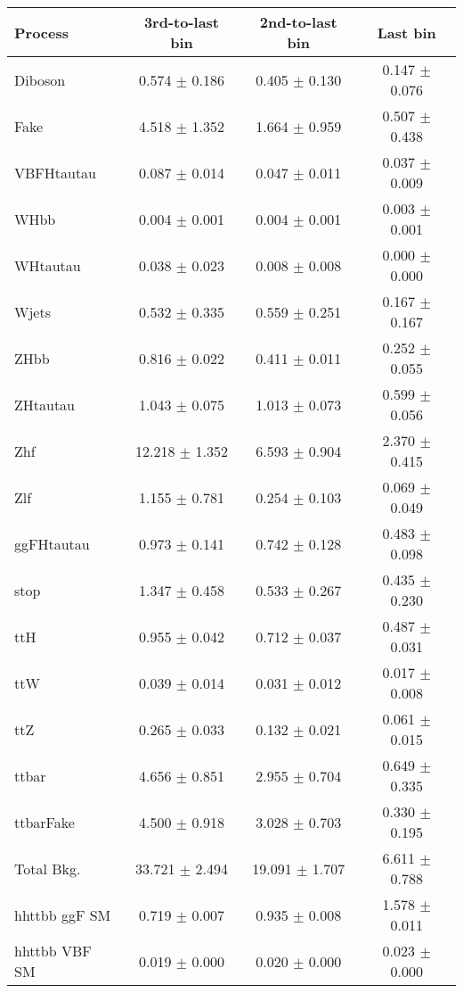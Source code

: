 \begin{tabular}{lccc}
  \toprule
  Process & 3rd-to-last bin & 2nd-to-last bin & Last bin \\
  \midrule
  Diboson &	0.574	$\pm$ 0.186	& 0.405	$\pm$ 0.130	& 0.147	$\pm$ 0.076 \\
  Fake &	4.518	$\pm$ 1.352	& 1.664	$\pm$ 0.959	& 0.507	$\pm$ 0.438 \\
  VBFHtautau &	0.087	$\pm$ 0.014	& 0.047	$\pm$ 0.011	& 0.037	$\pm$ 0.009 \\
  WHbb &	0.004	$\pm$ 0.001	& 0.004	$\pm$ 0.001	& 0.003	$\pm$ 0.001 \\
  WHtautau &	0.038	$\pm$ 0.023	& 0.008	$\pm$ 0.008	& 0.000	$\pm$ 0.000 \\
  Wjets &	0.532	$\pm$ 0.335	& 0.559	$\pm$ 0.251	& 0.167	$\pm$ 0.167 \\
  ZHbb &	0.816	$\pm$ 0.022	& 0.411	$\pm$ 0.011	& 0.252	$\pm$ 0.055 \\
  ZHtautau &	1.043	$\pm$ 0.075	& 1.013	$\pm$ 0.073	& 0.599	$\pm$ 0.056 \\
  Zhf &		12.218	$\pm$ 1.352	& 6.593	$\pm$ 0.904	& 2.370	$\pm$ 0.415 \\
  Zlf &		1.155	$\pm$ 0.781	& 0.254	$\pm$ 0.103	& 0.069	$\pm$ 0.049 \\
  ggFHtautau &	0.973	$\pm$ 0.141	& 0.742	$\pm$ 0.128	& 0.483	$\pm$ 0.098 \\
  stop &	1.347	$\pm$ 0.458	& 0.533	$\pm$ 0.267	& 0.435	$\pm$ 0.230 \\
  ttH &		0.955	$\pm$ 0.042	& 0.712	$\pm$ 0.037	& 0.487	$\pm$ 0.031 \\
  ttW &		0.039	$\pm$ 0.014	& 0.031	$\pm$ 0.012	& 0.017	$\pm$ 0.008 \\
  ttZ &		0.265	$\pm$ 0.033	& 0.132	$\pm$ 0.021	& 0.061	$\pm$ 0.015 \\
  ttbar &	4.656	$\pm$ 0.851	& 2.955	$\pm$ 0.704	& 0.649	$\pm$ 0.335 \\
  ttbarFake &	4.500	$\pm$ 0.918	& 3.028	$\pm$ 0.703	& 0.330	$\pm$ 0.195 \\
  \midrule
  Total Bkg.\ & 33.721	$\pm$ 2.494	& 19.091 $\pm$ 1.707	& 6.611	$\pm$ 0.788 \\
  \midrule
  hhttbb ggF SM &	0.719	$\pm$ 0.007	& 0.935	$\pm$ 0.008	& 1.578	$\pm$ 0.011 \\
  hhttbb VBF SM &	0.019	$\pm$ 0.000	& 0.020	$\pm$ 0.000	& 0.023	$\pm$ 0.000 \\
  \bottomrule
\end{tabular}
